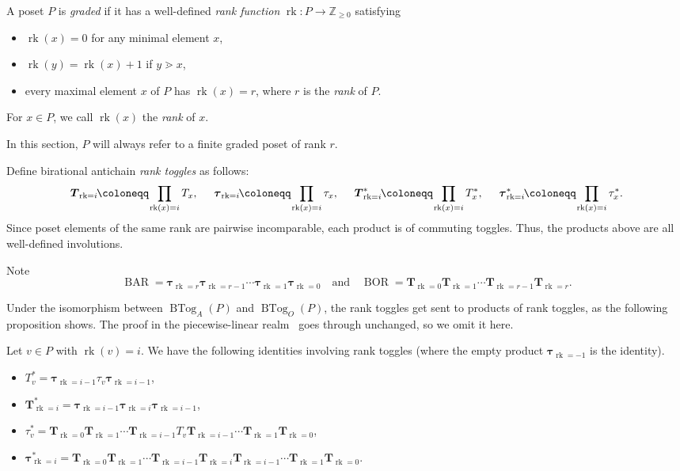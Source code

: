 \documentclass[ALCO,ThmDefs,Unicode,epreuves]{cedram}
\newcommand{\defn}[1]{\emph{#1}}
\newcommand{\zz}{\mathbb{Z}}
\newcommand{\ra}{\rightarrow}
\DeclareMathOperator{\btog}{BTog}
\DeclareMathOperator{\rk}{rk}
\DeclareMathOperator{\BAR}{BAR}
\DeclareMathOperator{\BOR}{BOR}
\newcommand{\rkT}[1]{\boldsymbol{T}_{\rk=#1}}
\newcommand{\rktau}[1]{\boldsymbol{\tau}_{\rk=#1}}
\newcommand*{\Mk}{\mkern -2mu}
\begin{document}
\begin{defi}[\cite{ec1ed2}]
A poset $P$ is \defn{graded} if it has a well-defined \defn{rank function} $\rk: P\ra \zz_{\geq 0}$ satisfying \begin{itemize}
\item $\rk(x)=0$ for any minimal element $x$,
\item $\rk(y)=\rk(x)+1$ if $y\gtrdot x$,
\item every maximal element $x$ of $P$ has $\rk(x)=r$, where $r$ is the \defn{rank} of $P$.
\end{itemize}
For $x\in P$, we call $\rk(x)$ the \defn{rank} of $x$.
\end{defi}

In this section, $P$ will always refer to a finite graded poset of rank $r$.

\begin{defi}
Define birational antichain \defn{rank toggles} as follows: 
\[
\rkT{i} \Mk \coloneqq \Mk \prod\limits_{\rk(x)=i} T_x,\hspace{0.194 in}\rktau{i}
\Mk \coloneqq \Mk \prod\limits_{\rk(x)=i} \tau_x,\hspace{0.194 in}\rkT{i}^*
\Mk \coloneqq \Mk \prod\limits_{\rk(x)=i} T_x^*,\hspace{0.194in}\rktau{i}^*
\Mk \coloneqq \Mk \prod\limits_{\rk(x)=i} \tau_x^*.
\] 
Since poset elements of the same rank are pairwise incomparable, each product is of commuting toggles.
Thus, the products above are all well-defined involutions.
\end{defi}

Note 
\[
\BAR=\rktau{r}\rktau{r-1}\cdots \rktau{1}\rktau{0}
\quad 
\text{and} \quad 
\BOR = \rkT{0} \rkT{1} \cdots \rkT{r-1} \rkT{r}.
\]

Under the isomorphism between $\btog_A(P)$ and $\btog_O(P)$, the rank toggles get sent to products of rank toggles, as the following proposition shows.
The proof in the piecewise-linear realm~\cite[Propositions~2.30,~2.31]{antichain-toggling}
goes through unchanged, so we omit it here. 

\begin{prop}
Let $v\in P$ with $\rk(v)=i$.
We have the following identities involving rank toggles
(where the empty product $\rktau{-1}$ is the identity). 
\begin{itemize}
 \item $T_v^*=\rktau{i-1}\tau_v\rktau{i-1}$,
 \item $\rkT{i}^*=
\rktau{i-1}\rktau{i}\rktau{i-1}$,
 \item $\tau_v^*=\rkT{0}\rkT{1}\cdots \rkT{i-1} T_v \rkT{i-1}\cdots \rkT{1}\rkT{0}$,
 \item $\rktau{i}^*=\rkT{0}\rkT{1}\cdots \rkT{i-1}\rkT{i}\rkT{i-1}\cdots \rkT{1}\rkT{0}$.
\end{itemize}
\end{prop}
\end{document}
